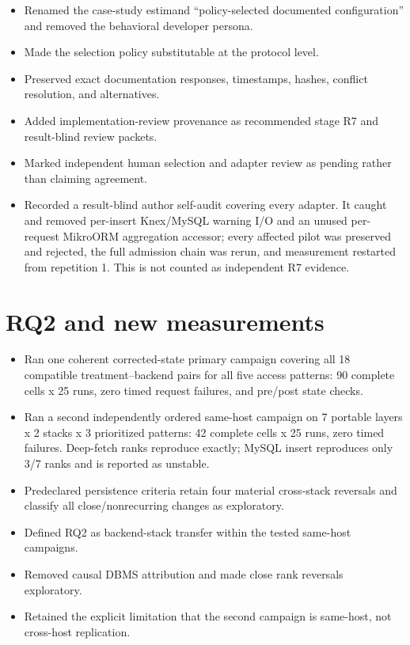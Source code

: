 \documentclass[11pt,a4paper]{article}
\begin{document}
\begin{itemize}
  \item Renamed the case-study estimand ``policy-selected documented configuration'' and removed the behavioral developer persona.
  \item Made the selection policy substitutable at the protocol level.
  \item Preserved exact documentation responses, timestamps, hashes, conflict resolution, and alternatives.
  \item Added implementation-review provenance as recommended stage R7 and result-blind review packets.
  \item Marked independent human selection and adapter review as pending rather than claiming agreement.
  \item Recorded a result-blind author self-audit covering every adapter. It caught and removed per-insert Knex/MySQL warning I/O and an unused per-request MikroORM aggregation accessor; every affected pilot was preserved and rejected, the full admission chain was rerun, and measurement restarted from repetition 1. This is not counted as independent R7 evidence.
\end{itemize}

\section*{RQ2 and new measurements}

\begin{itemize}
  \item Ran one coherent corrected-state primary campaign covering all 18 compatible treatment--backend pairs for all five access patterns: 90 complete cells x 25 runs, zero timed request failures, and pre/post state checks.
  \item Ran a second independently ordered same-host campaign on 7 portable layers x 2 stacks x 3 prioritized patterns: 42 complete cells x 25 runs, zero timed failures. Deep-fetch ranks reproduce exactly; MySQL insert reproduces only 3/7 ranks and is reported as unstable.
  \item Predeclared persistence criteria retain four material cross-stack reversals and classify all close/nonrecurring changes as exploratory.
  \item Defined RQ2 as backend-stack transfer within the tested same-host campaigns.
  \item Removed causal DBMS attribution and made close rank reversals exploratory.
  \item Retained the explicit limitation that the second campaign is same-host, not cross-host replication.
\end{itemize}
\end{document}
